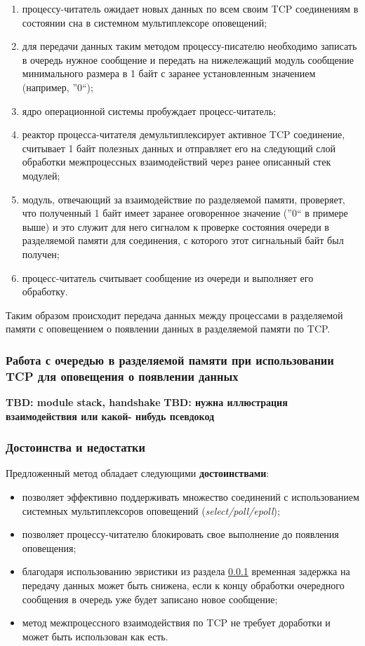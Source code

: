 \begin{enumerate}
\item процессу-читатель ожидает новых данных по всем своим TCP соединениям в состоянии сна в системном мультиплексоре оповещений;
\item для передачи данных таким методом процессу-писателю необходимо записать в очередь нужное сообщение и передать на нижележащий модуль сообщение минимального размера в 1 байт с заранее установленным значением (например, ''0``);
\item ядро операционной системы пробуждает процесс-читатель;
\item реактор процесса-читателя демультиплексирует активное TCP соединение, считывает 1 байт полезных данных и отправляет его на следующий слой обработки межпроцессных взаимодействий через ранее описанный стек модулей;
\item модуль, отвечающий за взаимодействие по разделяемой памяти, проверяет, что полученный 1 байт имеет заранее оговоренное значение (''0`` в примере выше) и это служит для него сигналом к проверке состояния очереди в разделяемой памяти для соединения, с которого этот сигнальный байт был получен;
\item процесс-читатель считывает сообщение из очереди и выполняет его обработку.
\end{enumerate}

Таким образом происходит передача данных между процессами в разделяемой памяти с оповещением о появлении данных в разделяемой памяти по TCP.

\subsubsection{Работа с очередью в разделяемой памяти при использовании TCP для оповещения о появлении данных}\label{chapter31:SharedMemoryOptimization}

\textbf{TBD: module stack, handshake}
\textbf{TBD: нужна иллюстрация взаимодействия или какой- нибудь псевдокод}

\subsubsection{Достоинства и недостатки}

Предложенный метод обладает следующими \textbf{достоинствами}:
\begin{itemize}
\item позволяет эффективно поддерживать множество соединений с использованием системных мультиплексоров оповещений (\textit{select/poll/epoll});
\item позволяет процессу-читателю блокировать свое выполнение до появления оповещения;
\item благодаря использованию эвристики из раздела \ref{chapter31:SharedMemoryOptimization} временная задержка на передачу данных может быть снижена, если к концу обработки очередного сообщения в очередь уже будет записано новое сообщение;
\item метод межпроцессного взаимодействия по TCP не требует доработки и может быть использован как есть.
\end{itemize}

